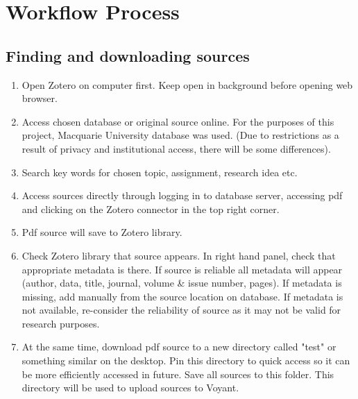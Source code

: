 \documentclass{article}
\begin{document}
\section{Workflow Process}
\subsection{Finding and downloading sources}
\begin{enumerate}
\item Open Zotero on computer first. Keep open in background before opening web browser.
    \item Access chosen database or original source online. For the purposes of this project, Macquarie University database was used. (Due to restrictions as a result of privacy and institutional access, there will be some differences).
    \item Search key words for chosen topic, assignment, research idea etc.
    \item Access sources directly through logging in to database server, accessing pdf and clicking on the Zotero connector in the top right corner.
    \item Pdf source will save to Zotero library.
     \item Check Zotero library that source appears. In right hand panel, check that appropriate metadata is there. If source is reliable all metadata will appear (author, data, title, journal, volume & issue number, pages). If metadata is missing, add manually from the source location on database. If metadata is not available, re-consider the reliability of source as it may not be valid for research purposes.
    \item At the same time, download pdf source to a new directory called "test" or something similar on the desktop. Pin this directory to quick access so it can be more efficiently accessed in future. Save all sources to this folder. This directory will be used to upload sources to Voyant. 
  \end{enumerate}
\end{document}
